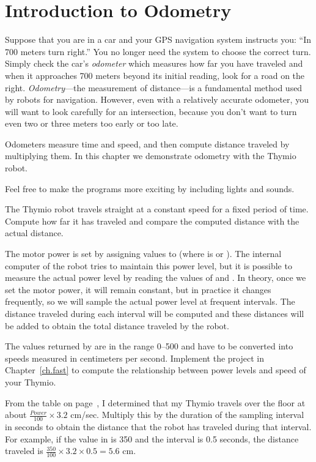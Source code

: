 
\chapter{Introduction to Odometry}\label{ch.odo}

Suppose that you are in a car and your GPS navigation system
instructs you: ``In 700 meters turn right.'' You no longer need the
system to choose the correct turn. Simply check the car's
\emph{odometer} which measures how far you have traveled and when it
approaches 700 meters beyond its initial reading, look for a road
on the right. \emph{Odometry}---the measurement of distance---is a
fundamental method used by robots for navigation.
However, even with a relatively accurate odometer, you will
want to look carefully for an intersection, because you don't want to
turn even two or three meters too early or too late.

Odometers measure time and speed,
and then compute distance traveled by multiplying them. In
this chapter we demonstrate odometry with the Thymio robot.

Feel free to make the programs more exciting by including lights
and sounds.


The Thymio robot travels straight at a constant speed for a fixed
period of time. Compute how far it has traveled and compare the
computed distance with the actual distance.


The motor power is set by assigning values to
 (where  is  or ). The internal
computer of the robot tries to maintain this power level, but it is
possible to measure the actual power level by reading the values of
 and . In theory, once we set
the motor power, it will remain constant, but in practice it changes
frequently, so we will sample the actual power level at frequent
intervals. The distance traveled during each interval will be computed
and these distances will be added to obtain the total distance
traveled by the robot.

The values returned by  are in the range 0--500 and
have to be converted into speeds measured in centimeters per second.
Implement the project in Chapter~\ref{ch.fast}
to compute the relationship between
power levels and speed of your Thymio.

From the table on page~\pageref{tab.speed},
I determined that my Thymio travels over the floor
at about $\frac{\mathit{Power}}{100}\times 3.2$ cm/sec. Multiply this by
the duration of the sampling interval in seconds to obtain the distance
that the robot has traveled during that interval. For example, if the
value in  is 350 and the interval is 0.5 seconds,
the distance traveled is $\frac{350}{100}\times 3.2 \times 0.5 = 5.6$ cm.

